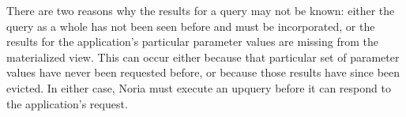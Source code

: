 There are two reasons why the results for a query may not be known: either the
query as a whole has not been seen before and must be incorporated, or the
results for the application's particular parameter values are missing from the
materialized view. This can occur either because that particular set of
parameter values have never been requested before, or because those results have
since been evicted. In either case, Noria must execute an upquery before it can
respond to the application's request.
